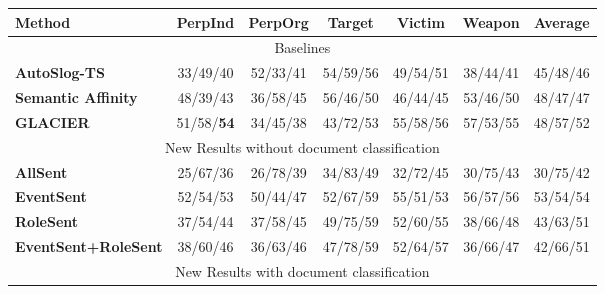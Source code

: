 \begin{table}[ht]

\footnotesize

\centering

\begin{tabular}[center]{|p{1.4in}|ccccc|c|} \hline



{\bf Method} & {\bf PerpInd} & {\bf PerpOrg} & {\bf Target} & {\bf Victim} &

{\bf Weapon}  & {\bf Average} \\ \hline

\multicolumn{7}{|c|}{Baselines} \\ \hline

{\bf AutoSlog-TS} & 33/49/40 & 52/33/41 & 54/59/56 & 49/54/51 & 38/44/41 & 45/48/46 \\



{\bf Semantic Affinity} & 48/39/43 & 36/58/45 & 56/46/50 & 46/44/45 & 53/46/50 & 48/47/47 \\

{\bf GLACIER} & 51/58/{\bf 54} & 34/45/38 & 43/72/53 & 55/58/56 & 57/53/55 & 48/57/52 \\ \hline



\multicolumn{7}{|c|}{New Results without document classification} \\ \hline

{\bf AllSent} & 25/67/36 & 26/78/39 & 34/83/49 & 32/72/45 & 30/75/43  & 30/75/42 \\

{\bf EventSent} & 52/54/53 & 50/44/47 & 52/67/59 & 55/51/53 & 56/57/56  & 53/54/54 \\

{\bf RoleSent} & 37/54/44 & 37/58/45 & 49/75/59 & 52/60/55 & 38/66/48  & 43/63/51 \\

{\bf EventSent+RoleSent} & 38/60/46 & 36/63/46 & 47/78/59 & 52/64/57 &

36/66/47  & 42/66/51 \\ \hline

\multicolumn{7}{|c|}{New Results with document classification} \\ \hline


\end{tabular}
\end{table}
